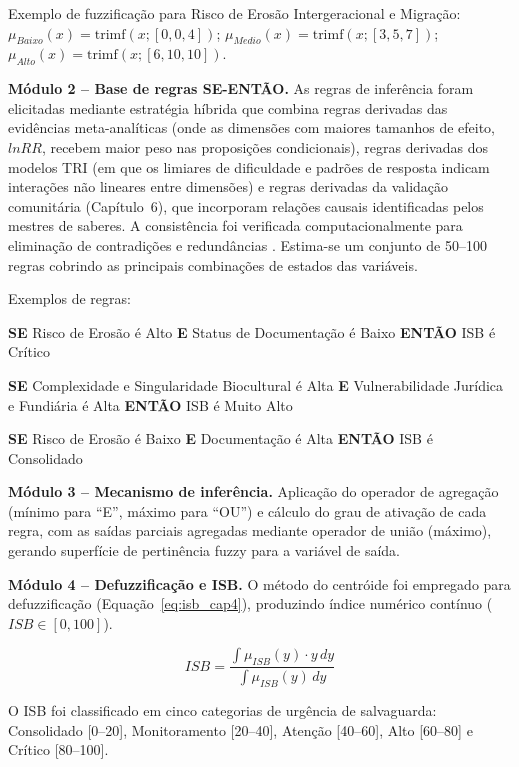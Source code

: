 Exemplo de fuzzificação para Risco de Erosão Intergeracional e Migração: $\mu_{Baixo}(x) = \text{trimf}(x; [0, 0, 4])$; $\mu_{Medio}(x) = \text{trimf}(x; [3, 5, 7])$; $\mu_{Alto}(x) = \text{trimf}(x; [6, 10, 10])$.

\textbf{Módulo 2 -- Base de regras SE-ENTÃO.} As regras de inferência foram elicitadas mediante estratégia híbrida que combina regras derivadas das evidências meta-analíticas (onde as dimensões com maiores tamanhos de efeito, $lnRR$, recebem maior peso nas proposições condicionais), regras derivadas dos modelos TRI (em que os limiares de dificuldade e padrões de resposta indicam interações não lineares entre dimensões) e regras derivadas da validação comunitária (Capítulo~6), que incorporam relações causais identificadas pelos mestres de saberes. A consistência foi verificada computacionalmente para eliminação de contradições e redundâncias \cite{Zadeh1965}. Estima-se um conjunto de 50--100 regras cobrindo as principais combinações de estados das variáveis.

Exemplos de regras:

\textbf{SE} Risco de Erosão é Alto \textbf{E} Status de Documentação é Baixo \textbf{ENTÃO} ISB é Crítico

\textbf{SE} Complexidade e Singularidade Biocultural é Alta \textbf{E} Vulnerabilidade Jurídica e Fundiária é Alta \textbf{ENTÃO} ISB é Muito Alto

\textbf{SE} Risco de Erosão é Baixo \textbf{E} Documentação é Alta \textbf{ENTÃO} ISB é Consolidado

\textbf{Módulo 3 -- Mecanismo de inferência.} Aplicação do operador de agregação (mínimo para ``E'', máximo para ``OU'') e cálculo do grau de ativação de cada regra, com as saídas parciais agregadas mediante operador de união (máximo), gerando superfície de pertinência fuzzy para a variável de saída.

\textbf{Módulo 4 -- Defuzzificação e ISB.} O método do centróide foi empregado para defuzzificação (Equação~\ref{eq:isb_cap4}), produzindo índice numérico contínuo ($ISB \in [0, 100]$).

\begin{equation}
ISB = \frac{\int \mu_{ISB}(y) \cdot y \, dy}{\int \mu_{ISB}(y) \, dy}
\label{eq:isb_cap4}
\end{equation}

O ISB foi classificado em cinco categorias de urgência de salvaguarda: Consolidado [0--20], Monitoramento [20--40], Atenção [40--60], Alto [60--80] e Crítico [80--100].


